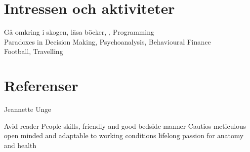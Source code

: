 \documentclass[11pt,a4paper]{article}
\begin{document}
\section{Intressen och aktiviteter}
\textbullet Gå omkring i skogen, läsa böcker, , Programming\\
Paradoxes in Decision Making, Psychoanalysis, Behavioural Finance\\
Football, Travelling

\section{Referenser}
Jeannette Unge

Avid reader
People skills, friendly and good bedside manner
Cautios meticulous
open minded and adaptable to working conditions
lifelong passion for anatomy and health
\end{document}
